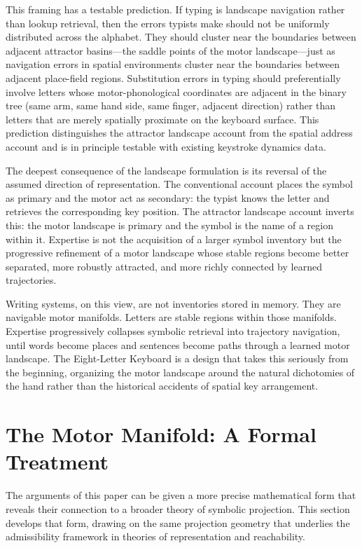 \documentclass[12pt,a4paper]{article}
\theoremstyle{plain}
\theoremstyle{definition}
\theoremstyle{remark}
\begin{document}
This framing has a testable prediction. If typing is landscape navigation
rather than lookup retrieval, then the errors typists make should not be
uniformly distributed across the alphabet. They should cluster near the
boundaries between adjacent attractor basins---the saddle points of the motor
landscape---just as navigation errors in spatial environments cluster near
the boundaries between adjacent place-field regions. Substitution errors in
typing should preferentially involve letters whose motor-phonological coordinates
are adjacent in the binary tree (same arm, same hand side, same finger, adjacent
direction) rather than letters that are merely spatially proximate on the
keyboard surface. This prediction distinguishes the attractor landscape account
from the spatial address account and is in principle testable with existing
keystroke dynamics data.

The deepest consequence of the landscape formulation is its reversal of the
assumed direction of representation. The conventional account places the symbol
as primary and the motor act as secondary: the typist knows the letter and
retrieves the corresponding key position. The attractor landscape account
inverts this: the motor landscape is primary and the symbol is the name of
a region within it. Expertise is not the acquisition of a larger symbol
inventory but the progressive refinement of a motor landscape whose stable
regions become better separated, more robustly attracted, and more richly
connected by learned trajectories.

Writing systems, on this view, are not inventories stored in memory. They are
navigable motor manifolds. Letters are stable regions within those manifolds.
Expertise progressively collapses symbolic retrieval into trajectory navigation,
until words become places and sentences become paths through a learned motor
landscape. The Eight-Letter Keyboard is a design that takes this seriously from
the beginning, organizing the motor landscape around the natural dichotomies of
the hand rather than the historical accidents of spatial key arrangement.

\section{The Motor Manifold: A Formal Treatment}

The arguments of this paper can be given a more precise mathematical form that
reveals their connection to a broader theory of symbolic projection. This
section develops that form, drawing on the same projection geometry that
underlies the admissibility framework in theories of representation and
reachability.
\end{document}
